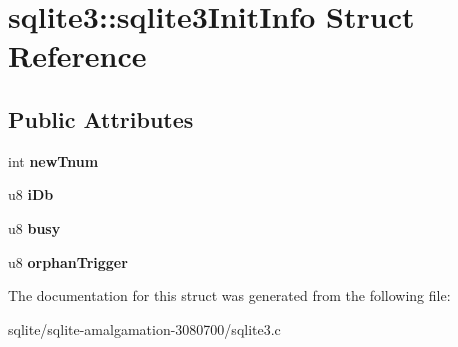 \hypertarget{structsqlite3_1_1sqlite3_init_info}{\section{sqlite3\+:\+:sqlite3\+Init\+Info Struct Reference}
\label{structsqlite3_1_1sqlite3_init_info}
}
\subsection*{Public Attributes}
\begin{DoxyCompactItemize}
\item 
\hypertarget{structsqlite3_1_1sqlite3_init_info_a65250c8c5f215989e64294ede6c1c268}{int {\bfseries new\+Tnum}}\label{structsqlite3_1_1sqlite3_init_info_a65250c8c5f215989e64294ede6c1c268}

\item 
\hypertarget{structsqlite3_1_1sqlite3_init_info_af72389cb54753544c0f578605e6604bb}{u8 {\bfseries i\+Db}}\label{structsqlite3_1_1sqlite3_init_info_af72389cb54753544c0f578605e6604bb}

\item 
\hypertarget{structsqlite3_1_1sqlite3_init_info_a6ac01842e0ae68023cb60fea93bd8688}{u8 {\bfseries busy}}\label{structsqlite3_1_1sqlite3_init_info_a6ac01842e0ae68023cb60fea93bd8688}

\item 
\hypertarget{structsqlite3_1_1sqlite3_init_info_ac292839cc81d109206133a80949c45a6}{u8 {\bfseries orphan\+Trigger}}\label{structsqlite3_1_1sqlite3_init_info_ac292839cc81d109206133a80949c45a6}

\end{DoxyCompactItemize}


The documentation for this struct was generated from the following file\+:\begin{DoxyCompactItemize}
\item 
sqlite/sqlite-\/amalgamation-\/3080700/sqlite3.\+c\end{DoxyCompactItemize}
